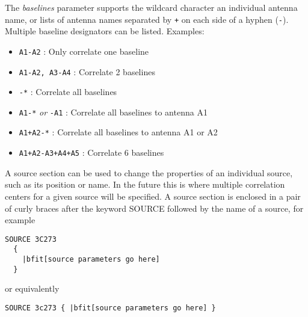The {\em baselines} parameter supports the wildcard character {\tt *} an individual antenna name, or lists of antenna names separated by {\tt +} on each side of a hyphen ({\tt -}).
Multiple baseline designators can be listed.
Examples:
\begin{itemize}
\item {\tt A1-A2} : Only correlate one baseline
\item {\tt A1-A2, A3-A4} : Correlate 2 baselines
\item {\tt *-*} : Correlate all baselines
\item {\tt A1-*} {\em or} {\tt *-A1} : Correlate all baselines to antenna A1
\item {\tt A1+A2-*} : Correlate all baselines to antenna A1 or A2
\item {\tt A1+A2-A3+A4+A5} : Correlate 6 baselines
\end{itemize}

A source section can be used to change the properties of an individual source, such as its position or name.
In the future this is where multiple correlation centers for a given source will be specified.
A source section is enclosed in a pair of curly braces after the keyword SOURCE followed by the name of a source, for example

\begin{Verbatim}[commandchars=\|\[\]]
  SOURCE 3C273
  {
    |bfit[source parameters go here]
  }
\end{Verbatim}

\noindent
or equivalently

\begin{Verbatim}[commandchars=\|\[\]]
  SOURCE 3c273 { |bfit[source parameters go here] }
\end{Verbatim}


